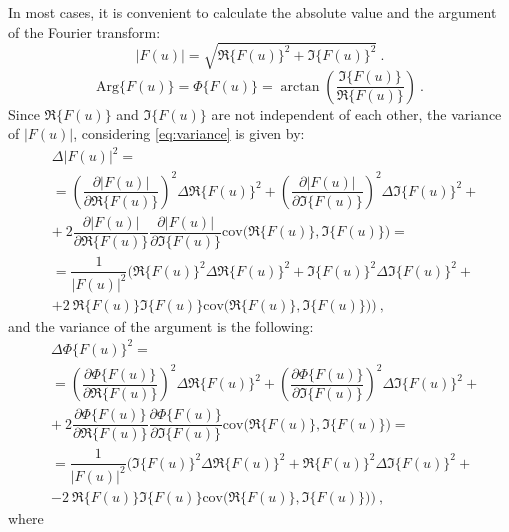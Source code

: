 \documentclass[a4paper,12pt,oneside]{article}
\newcommand{\Arg}{\Phi}
\begin{document}
In most cases, it is convenient to calculate the absolute value and the argument of the Fourier transform:
\begin{equation}\label{eq:abs1}
  |F(u)| = \sqrt{\Re\{F(u)\}^2 + \Im\{F(u)\}^2} \ .
\end{equation}
\begin{equation}\label{eq:arg1}
  \mathrm{Arg}\{F(u)\} = \Arg\{F(u)\} = \arctan\left(\dfrac{\Im\{F(u)\}}{\Re\{F(u)\}}\right) \ .
\end{equation}
Since $\Re\{F(u)\}$ and $\Im\{F(u)\}$ are not independent of each other, the variance of $|F(u)|$, considering \eqref{eq:variance} is given by:
\begin{eqnarray}\label{eq:abs_err}
  & \Delta |F(u)|^2 = \nonumber\\
  & = \left( \dfrac{\partial |F(u)|}{\partial \Re\{F(u)\}} \right)^2 \Delta \Re\{F(u)\}^2
  + \left( \dfrac{\partial |F(u)|}{\partial \Im\{F(u)\}} \right)^2 \Delta \Im\{F(u)\}^2 + \nonumber\\
  & +\ 2 \dfrac{\partial |F(u)|}{\partial \Re\{F(u)\}} \dfrac{\partial |F(u)|}{\partial \Im\{F(u)\}}
  \mathrm{cov} \Big( \Re\{F(u)\}, \Im\{F(u)\} \Big) = \nonumber\\
  & = \dfrac{1}{|F(u)|^2} \Bigg( \Re\{F(u)\}^2 \Delta \Re\{F(u)\}^2 + \Im\{F(u)\}^2 \Delta \Im\{F(u)\}^2  + \nonumber\\
  & + 2\ \Re\{F(u)\} \Im\{F(u)\} \mathrm{cov} \Big( \Re\{F(u)\}, \Im\{F(u)\} \Big)  \Bigg)\ ,
\end{eqnarray}
and the variance of the argument is the following:
\begin{eqnarray}\label{eq:arg_err}
  & \Delta \Arg\{F(u)\}^2 = \nonumber\\
  & = \left( \dfrac{\partial \Arg\{F(u)\}}{\partial \Re\{F(u)\}} \right)^2 \Delta \Re\{F(u)\}^2
  + \left( \dfrac{\partial \Arg\{F(u)\}}{\partial \Im\{F(u)\}} \right)^2 \Delta \Im\{F(u)\}^2 + \nonumber\\
  & +\ 2 \dfrac{\partial \Arg\{F(u)\}}{\partial \Re\{F(u)\}} \dfrac{\partial \Arg\{F(u)\}}{\partial \Im\{F(u)\}}
  \mathrm{cov} \Big( \Re\{F(u)\}, \Im\{F(u)\} \Big) = \nonumber\\
  & = \dfrac{1}{|F(u)|^2} \Bigg( \Im\{F(u)\}^2 \Delta \Re\{F(u)\}^2 + \Re\{F(u)\}^2 \Delta \Im\{F(u)\}^2  + \nonumber\\
  & - 2\ \Re\{F(u)\} \Im\{F(u)\} \mathrm{cov} \Big( \Re\{F(u)\}, \Im\{F(u)\} \Big)  \Bigg)\ ,
\end{eqnarray}
where
\end{document}
